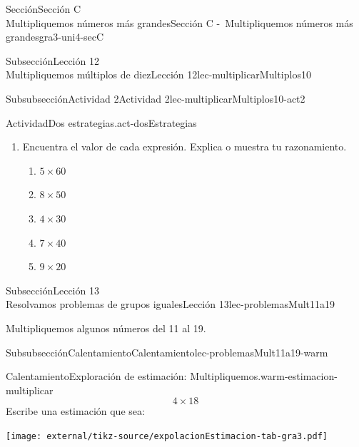 \begin{sectionptx}{Sección}{{\Large Sección C\\}Multipliquemos números más grandes}{}{Sección C -~Multipliquemos números más grandes}{}{}{gra3-uni4-secC}
\begin{subsectionptx}{Subsección}{{\normalsize Lección 12\\[-0.05cm]}Multipliquemos múltiplos de diez}{}{Lección 12}{}{}{lec-multiplicarMultiplos10}
\begin{subsubsectionptx}{Subsubsección}{Actividad 2}{}{Actividad 2}{}{}{lec-multiplicarMultiplos10-act2}
\begin{activity}{Actividad}{Dos estrategias.}{act-dosEstrategias}
\begin{enumerate}
\begin{itemize}[label=\textbullet]
\item{}Kiran dijo que él sabía que \(8\times 3\) es 24, luego encontró \(24\times 10\) y obtuvo 240.%
\end{itemize}
¿En qué se parecen las estrategias de Jada y de Kiran? ¿En qué son diferentes?%
\item{}Encuentra el valor de cada expresión. Explica o muestra tu razonamiento.%
%
\begin{enumerate}
\item{}\(\displaystyle 5 \times 60\)%
\item{}\(\displaystyle 8 \times 50\)%
\item{}\(\displaystyle 4 \times 30\)%
\item{}\(\displaystyle 7 \times 40\)%
\item{}\(\displaystyle 9 \times 20\)%
\end{enumerate}
\end{enumerate}
\end{activity}%
\end{subsubsectionptx}
\end{subsectionptx}
%
%
\typeout{************************************************}
\typeout{************************************************}
%
\clearpage
\begin{subsectionptx}{Subsección}{{\normalsize Lección 13\\[-0.05cm]}Resolvamos problemas de grupos iguales}{}{Lección 13}{}{}{lec-problemasMult11a19}
\begin{introduction}{}%
Multipliquemos algunos números del 11 al 19.%
\end{introduction}%
%
%
\typeout{************************************************}
\typeout{************************************************}
%
\begin{subsubsectionptx}{Subsubsección}{Calentamiento}{}{Calentamiento}{}{}{lec-problemasMult11a19-warm}
\begin{exploration}{Calentamiento}{Exploración de estimación: Multipliquemos.}{warm-estimacion-multiplicar}%
%
\begin{equation*}
4\times 18
\end{equation*}
Escribe una estimación que sea:%
\begin{image}{0}{1}{0}{}%
\texttt{[image: external/tikz-source/expolacionEstimacion-tab-gra3.pdf]}
\end{image}%

\end{exploration}
\end{subsubsectionptx}
\end{subsectionptx}
\end{sectionptx}
